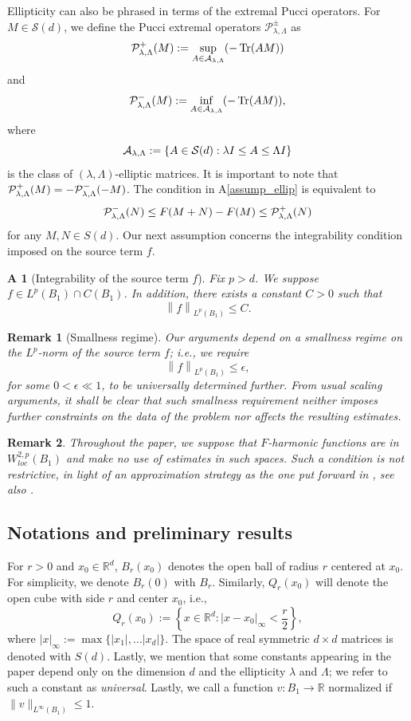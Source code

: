 \documentclass[10pt]{article} %
\DeclareMathOperator{\Tr}{Tr}
\newtheorem{Remark}{Remark}
\newtheorem{Assumption}{A}
\begin{document}
Ellipticity can also be phrased in terms of the extremal Pucci operators. For $M\in \mathcal{S}(d)$, we define the Pucci extremal operators $\mathcal{P}_{\lambda,\Lambda}^\pm$ as
\[
{\cal P}_{\lambda,\Lambda}^+(M) := \sup_{A\in {\cal A}_{\lambda,\Lambda}}(-\Tr(AM))
\]
and 
\[
{\cal P}_{\lambda,\Lambda}^-(M) := \inf_{A\in {\cal A}_{\lambda,\Lambda}}(-\Tr(AM)),
\]
where 
\[
	{\cal A}_{\lambda,\Lambda} := \{A \in \mathcal{S}(d) : \lambda I\leq A \leq \Lambda I\}
\]
is the class of $(\lambda,\Lambda)$-elliptic matrices. It is important to note that ${\cal P}_{\lambda,\Lambda}^+(M) = -{\cal P}_{\lambda,\Lambda}^-(-M)$. The condition in A\ref{assump_ellip} is equivalent to
\[
	{\cal P}_{\lambda,\Lambda}^-(N) \leq F(M+N) - F(M) \leq {\cal P}_{\lambda,\Lambda}^+(N)
\]
for any $M,N \in S(d)$. Our next assumption concerns the integrability condition imposed on the source term $f$.

\begin{Assumption}[Integrability of the source term $f$]\label{assump_source}
Fix $p>d$. We suppose $f \in L^{p}(B_1)\cap C(B_1)$. In addition, there exists a constant $C>0$ such that
\[
	\left\|f\right\|_{L^{p}(B_1)} \leq C.
\]
\end{Assumption}

\begin{Remark}[Smallness regime]
Our arguments depend on a smallness regime on the $L^p$-norm of the source term $f$; i.e., we require
\[
	\left\|f\right\|_{L^p(B_1)}\leq \epsilon,
\]
for some $0<\epsilon \ll1$, to be universally determined further. From usual scaling arguments, it shall be clear that such smallness requirement neither imposes further constraints on the data of the problem nor affects the resulting estimates.
\end{Remark}


\begin{Remark}
Throughout the paper, we suppose that $F$-harmonic functions are in $W^{2,p}_{loc}(B_1)$ and make no use of estimates in such spaces. Such a condition is not restrictive, in light of an approximation strategy as the one put forward in \cite[Section 8]{PT}, see also \cite[Theorem 1.1]{PT}.
\end{Remark}

\subsection{Notations and preliminary results}\label{sec_nr}

For $r >0$ and $x_0 \in \mathbb{R}^d$, $B_r(x_0)$ denotes the open ball of radius $r$ centered at $x_0$. For simplicity, we denote $B_r(0)$ with $B_r$. Similarly, $Q_r(x_0)$ will denote the open cube with side $r$ and center $x_0$, i.e.,
\[
Q_r(x_0) := \left\lbrace x\in \mathbb{R}^d: |x-x_0|_\infty <\frac{r}{2}\right\rbrace,
\]
where $|x|_\infty := \max\{|x_1|, \ldots|x_d|\}$. The space of real symmetric $d\times d$ matrices is denoted with $S(d)$. Lastly, we mention that some constants appearing in the paper depend only on the dimension $d$ and the ellipticity $\lambda$ and $\Lambda$; we refer to such a constant as \emph{universal}. Lastly, we call a function $v:B_1\to\mathbb{R}$  normalized if $\|v\|_{L^\infty(B_1)}\leq 1$.
\end{document}
